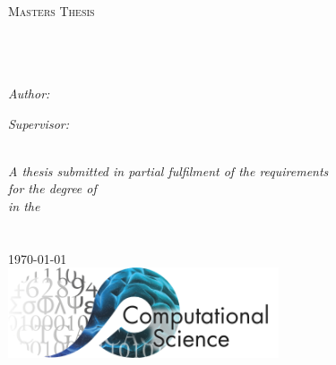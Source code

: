 \documentclass[11pt, oneside]{Thesis} %
\begin{document}
\begin{titlepage}
\begin{center}

\textsc{\LARGE \univname}\\[1.5cm] %
\textsc{\Large Masters Thesis}\\[0.5cm] %

\HRule \\[0.4cm] %
{\huge \bfseries \ttitle}\\[0.4cm] %
\HRule \\[1.5cm] %
 
\begin{minipage}{0.4\textwidth}
\begin{flushleft} \large
\emph{Author:}\\
\href{http://yourwebaddress.com}{\authornames} %
\end{flushleft}
\end{minipage}
\begin{minipage}{0.4\textwidth}
\begin{flushright} \large
\emph{Supervisor:} \\
\href{http://mhlees.com}{\supname} %
\end{flushright}
\end{minipage}\\[3cm]
 
\large \textit{A thesis submitted in partial fulfilment of the requirements\\ for the degree of \degreename}\\[0.3cm] %
\textit{in the}\\[0.4cm]
\groupname\\\deptname\\[2cm] %
 
{\large \today}\\[2cm] %
\includegraphics[width=0.6\textwidth]{clslogo.png} %
 
\vfill
\end{center}

\end{titlepage}
\end{document}
